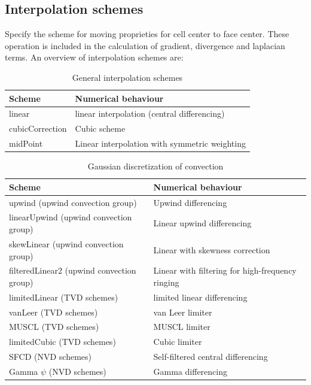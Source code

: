 \documentclass[a4paper,12pt]{article}
\begin{document}
\subsection{Interpolation schemes}
Specify the scheme for moving proprieties for cell center to face center. These operation is included in the calculation of gradient, divergence and laplacian terms. An overview of interpolation schemes are:

\begin{table}[H]
\centering
\begin{tabular}{ll}
\toprule
Scheme          & Numerical behaviour                           \\ \midrule
linear          & linear interpolation (central differencing)   \\
cubicCorrection & Cubic scheme                                  \\
midPoint        & Linear interpolation with symmetric weighting \\ \bottomrule
\end{tabular}
\caption{General interpolation schemes}
\label{table:interpolation_general}
\end{table}

\begin{table}[H]
\centering
\begin{tabular}{ll}
\toprule
Scheme                                    & Numerical behaviour                              \\ \midrule
upwind (upwind convection group)          & Upwind differencing                              \\
linearUpwind (upwind convection group)    & Linear upwind differencing                       \\
skewLinear (upwind convection group)      & Linear with skewness correction                  \\
filteredLinear2 (upwind convection group) & Linear with filtering for high-frequency ringing \\
limitedLinear (TVD schemes)               & limited linear differencing                      \\
vanLeer (TVD schemes)                     & van Leer limiter                                 \\
MUSCL (TVD schemes)                       & MUSCL limiter                                    \\
limitedCubic (TVD schemes)                & Cubic limiter                                    \\
SFCD (NVD schemes)                        & Self-filtered central differencing               \\
Gamma $\psi$  (NVD schemes)               & Gamma differencing                               \\ \bottomrule
\end{tabular}
\caption{Gaussian discretization of convection}
\label{table:interpolation_convection}
\end{table}
\end{document}
